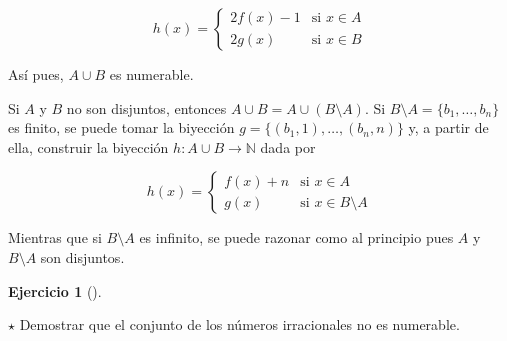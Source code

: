 \documentclass[
  a4paper,
]{scrreport}
\theoremstyle{definition}
\newtheorem{exercise}{Ejercicio}[chapter]
\theoremstyle{remark}
\begin{document}
\begin{tcolorbox}
\begin{tcolorbox}
\begin{tcolorbox}
\begin{tcolorbox}
\begin{tcolorbox}
\begin{tcolorbox}
\begin{tcolorbox}
\begin{tcolorbox}
\begin{tcolorbox}
\begin{tcolorbox}
\begin{tcolorbox}
\begin{tcolorbox}
\begin{tcolorbox}
\begin{tcolorbox}
\begin{tcolorbox}
\begin{tcolorbox}
\begin{tcolorbox}
\begin{tcolorbox}
\begin{tcolorbox}
\begin{tcolorbox}
\begin{tcolorbox}
\begin{tcolorbox}
\begin{tcolorbox}
\begin{tcolorbox}
\begin{tcolorbox}
\begin{tcolorbox}
\begin{tcolorbox}
\begin{tcolorbox}
\begin{tcolorbox}
\begin{tcolorbox}
\begin{tcolorbox}
\begin{tcolorbox}
\begin{tcolorbox}
\begin{tcolorbox}
\begin{tcolorbox}
\begin{tcolorbox}
\begin{tcolorbox}
\begin{tcolorbox}
\begin{tcolorbox}
\[h(x)=
\begin{cases}
2f(x)-1 & \mbox{si } x\in A\\
2g(x) & \mbox{si } x\in B
\end{cases}
\]

Así pues, \(A\cup B\) es numerable.

Si \(A\) y \(B\) no son disjuntos, entonces
\(A\cup B=A\cup (B\setminus A)\). Si
\(B\setminus A=\{b_1,\ldots, b_n\}\) es finito, se puede tomar la
biyección \(g=\{(b_1,1),\ldots,(b_n,n)\}\) y, a partir de ella,
construir la biyección \(h:A\cup B\to \mathbb{N}\) dada por

\[h(x)=
\begin{cases}
f(x)+n & \mbox{si } x\in A\\
g(x) & \mbox{si } x\in B\setminus A
\end{cases}
\]

Mientras que si \(B\setminus A\) es infinito, se puede razonar como al
principio pues \(A\) y \(B\setminus A\) son disjuntos.

\end{tcolorbox}

\begin{exercise}[]\protect\hypertarget{exr-irracionales-no-numerables}{}\label{exr-irracionales-no-numerables}

\(\star\) Demostrar que el conjunto de los números irracionales no es
numerable.

\end{exercise}


\end{tcolorbox}
\end{tcolorbox}
\end{tcolorbox}
\end{tcolorbox}
\end{tcolorbox}
\end{tcolorbox}
\end{tcolorbox}
\end{tcolorbox}
\end{tcolorbox}
\end{tcolorbox}
\end{tcolorbox}
\end{tcolorbox}
\end{tcolorbox}
\end{tcolorbox}
\end{tcolorbox}
\end{tcolorbox}
\end{tcolorbox}
\end{tcolorbox}
\end{tcolorbox}
\end{tcolorbox}
\end{tcolorbox}
\end{tcolorbox}
\end{tcolorbox}
\end{tcolorbox}
\end{tcolorbox}
\end{tcolorbox}
\end{tcolorbox}
\end{tcolorbox}
\end{tcolorbox}
\end{tcolorbox}
\end{tcolorbox}
\end{tcolorbox}
\end{tcolorbox}
\end{tcolorbox}
\end{tcolorbox}
\end{tcolorbox}
\end{tcolorbox}
\end{tcolorbox}
\end{document}
